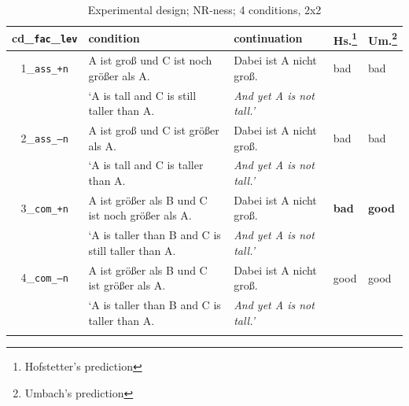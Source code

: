 \documentclass[output=paper,
modfonts
]{langscibook}
\begin{document}
\begin{table}[H]\scriptsize
\begin{tabular}{cllll}
\lsptoprule
cd\_\texttt{fac}\_\texttt{lev} & condition & continuation & Hs.\footnote{ Hofstetter's prediction} & Um.\footnote{ Umbach's prediction} \\
\midrule  
1\_\texttt{ass\_\footnotesize{+}n} & A ist groß \hspace{25pt} und C ist noch größer als A. & Dabei ist A nicht groß. & bad &  bad \\
 & {`A is tall \hspace{32pt} and C is \hspace{0.4pt} still \hspace{2pt} taller than A.} & \textit{And yet A is not tall.'} & & \\
\midrule
2\_\texttt{ass\_\footnotesize{--}n} & A ist groß \hspace{25pt} und C ist \hspace{16pt} größer als A. & Dabei ist A nicht groß. & bad & bad \\
 & {`A is tall \hspace{32pt} and C is \hspace{19pt} taller than A.} & \textit{And yet A is not tall.'} & & \\
\midrule 
3\_\texttt{com\_\footnotesize{+}n} & A ist größer als B \hspace{0.65pt} und C ist noch größer als A. & Dabei ist A nicht groß. & \textbf{bad} & \textbf{good} \\
 & {`A is taller than B \hspace{2pt} and C is \hspace{0.4pt} still \hspace{2pt} taller than A.} & \textit{And yet A is not tall.'} & & \\
\midrule
4\_\texttt{com\_\footnotesize{--}n} & A ist größer als B \hspace{0.65pt} und C ist \hspace{16pt} größer als A. & Dabei ist A nicht groß. & good & good \\
 & {`A is taller than B \hspace{2pt} and C is \hspace{19pt} taller than A.} & \textit{And yet A is not tall.'} & & \\
\lspbottomrule
\end{tabular}
\caption{Experimental design; NR-ness; 4 conditions, 2x2}
\label{tab:4_conds_material}
\end{table}
\end{document}
